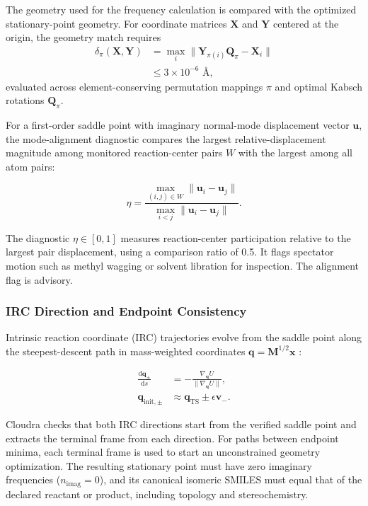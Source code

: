 The geometry used for the frequency calculation is compared with the optimized stationary-point geometry. For coordinate matrices $\mathbf{X}$ and $\mathbf{Y}$ centered at the origin, the geometry match requires
\[
\begin{aligned}
\delta_\pi(\mathbf{X},\mathbf{Y})
&=\max_i\|\mathbf{Y}_{\pi(i)}\mathbf{Q}_\pi-\mathbf{X}_i\|\\
&\le 3\times 10^{-6}\text{ Å},
\end{aligned}
\]
evaluated across element-conserving permutation mappings $\pi$ and optimal Kabsch rotations $\mathbf{Q}_\pi$.

For a first-order saddle point with imaginary normal-mode displacement vector $\mathbf{u}$, the mode-alignment diagnostic compares the largest relative-displacement magnitude among monitored reaction-center pairs $W$ with the largest among all atom pairs:

\begin{equation}\label{eq:methods-11}
\eta=\frac{\max_{(i,j)\in W}\|\mathbf{u}_i-\mathbf{u}_j\|}{\max_{i<j}\|\mathbf{u}_i-\mathbf{u}_j\|}.
\end{equation}

The diagnostic $\eta\in[0,1]$ measures reaction-center participation relative to the largest pair displacement, using a comparison ratio of 0.5. It flags spectator motion such as methyl wagging or solvent libration for inspection. The alignment flag is advisory.

\subsubsection{IRC Direction and Endpoint Consistency}
Intrinsic reaction coordinate (IRC) trajectories evolve from the saddle point along the steepest-descent path in mass-weighted coordinates $\mathbf{q}=\mathbf{M}^{1/2}\mathbf{x}$ \citep{ref09,ref10}:

\begin{equation}\label{eq:methods-12}
\begin{aligned}
\frac{\mathrm{d}\mathbf{q}_{\pm}}{\mathrm{d}s}&=-\frac{\nabla_{\mathbf{q}}U}{\|\nabla_{\mathbf{q}}U\|},\\
\mathbf{q}_{\mathrm{init},\pm}&\approx\mathbf{q}_{\mathrm{TS}}\pm\epsilon\mathbf{v}_-.
\end{aligned}
\end{equation}

Cloudra checks that both IRC directions start from the verified saddle point and extracts the terminal frame from each direction. For paths between endpoint minima, each terminal frame is used to start an unconstrained geometry optimization. The resulting stationary point must have zero imaginary frequencies ($n_{\mathrm{imag}}=0$), and its canonical isomeric SMILES must equal that of the declared reactant or product, including topology and stereochemistry.

